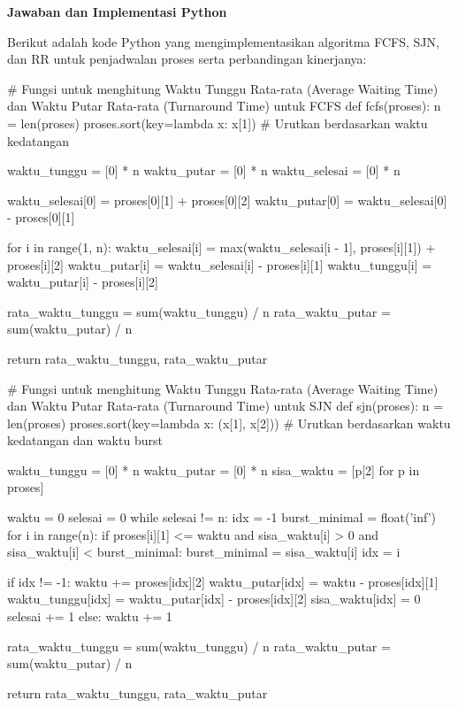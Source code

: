 \documentclass[12pt]{article}
\begin{document}
\textbf{Jawaban dan Implementasi Python}

Berikut adalah kode Python yang mengimplementasikan algoritma FCFS, SJN, dan RR untuk penjadwalan proses serta perbandingan kinerjanya:

\begin{python}
# Fungsi untuk menghitung Waktu Tunggu Rata-rata (Average Waiting Time) dan Waktu Putar Rata-rata (Turnaround Time) untuk FCFS
def fcfs(proses):
    n = len(proses)
    proses.sort(key=lambda x: x[1])  # Urutkan berdasarkan waktu kedatangan

    waktu_tunggu = [0] * n
    waktu_putar = [0] * n
    waktu_selesai = [0] * n

    waktu_selesai[0] = proses[0][1] + proses[0][2]
    waktu_putar[0] = waktu_selesai[0] - proses[0][1]
    
    for i in range(1, n):
        waktu_selesai[i] = max(waktu_selesai[i - 1], proses[i][1]) + proses[i][2]
        waktu_putar[i] = waktu_selesai[i] - proses[i][1]
        waktu_tunggu[i] = waktu_putar[i] - proses[i][2]

    rata_waktu_tunggu = sum(waktu_tunggu) / n
    rata_waktu_putar = sum(waktu_putar) / n

    return rata_waktu_tunggu, rata_waktu_putar

# Fungsi untuk menghitung Waktu Tunggu Rata-rata (Average Waiting Time) dan Waktu Putar Rata-rata (Turnaround Time) untuk SJN
def sjn(proses):
    n = len(proses)
    proses.sort(key=lambda x: (x[1], x[2]))  # Urutkan berdasarkan waktu kedatangan dan waktu burst

    waktu_tunggu = [0] * n
    waktu_putar = [0] * n
    sisa_waktu = [p[2] for p in proses]

    waktu = 0
    selesai = 0
    while selesai != n:
        idx = -1
        burst_minimal = float('inf')
        for i in range(n):
            if proses[i][1] <= waktu and sisa_waktu[i] > 0 and sisa_waktu[i] < burst_minimal:
                burst_minimal = sisa_waktu[i]
                idx = i
        
        if idx != -1:
            waktu += proses[idx][2]
            waktu_putar[idx] = waktu - proses[idx][1]
            waktu_tunggu[idx] = waktu_putar[idx] - proses[idx][2]
            sisa_waktu[idx] = 0
            selesai += 1
        else:
            waktu += 1

    rata_waktu_tunggu = sum(waktu_tunggu) / n
    rata_waktu_putar = sum(waktu_putar) / n

    return rata_waktu_tunggu, rata_waktu_putar


\end{python}
\end{document}

